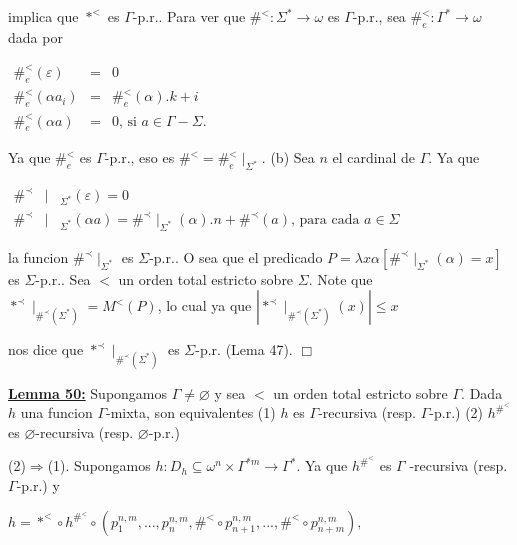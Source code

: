 implica que \(\ast ^{< }\) es \(\Gamma \)-p.r..
Para ver que \(\#^{< }:\Sigma ^{\ast }\rightarrow \omega \) es \(\Gamma \)-p.r., sea \(\#_{e}^{< }:\Gamma ^{\ast }\rightarrow \omega \) dada por

\(\displaystyle \begin{array}{rcl} \#_{e}^{< }(\varepsilon ) & =& 0 \\ \#_{e}^{< }(\alpha a_{i}) & =& \#_{e}^{< }(\alpha ).k+i \\ \#_{e}^{< }(\alpha a) & =& 0\text{, si }a\in \Gamma -\Sigma . \end{array} \)

Ya que \(\#_{e}^{< }\) es \(\Gamma \)-p.r., eso es \(\#^{< }=\#_{e}^{< }\mid _{\Sigma ^{\ast }}\).
(b) Sea \(n\) el cardinal de \(\Gamma .\) Ya que

\(\displaystyle \begin{array}{rcl} \#^{\prec } & \mid & _{\Sigma ^{\ast }}(\varepsilon )=0 \\ \#^{\prec } & \mid & _{\Sigma ^{\ast }}(\alpha a)=\#^{\prec }\mid _{\Sigma ^{\ast }}(\alpha ).n+\#^{\prec }(a)\text{, para cada }a\in \Sigma \end{array} \)

la funcion \(\#^{\prec }\mid _{\Sigma ^{\ast }}\) es \(\Sigma \)-p.r.. O sea que el predicado \(P=\lambda x\alpha \left[ \#^{\prec }\mid _{\Sigma ^{\ast }}(\alpha )=x\right] \) es \(\Sigma \)-p.r.. Sea \(< \) un orden total estricto sobre \(\Sigma \). Note que \(\ast ^{\prec }\mid _{\#^{\prec }(\Sigma ^{\ast })}=M^{< }(P)\), lo cual ya que
\(\displaystyle \left\vert \ast ^{\prec }\mid _{\#^{\prec }(\Sigma ^{\ast })}(x)\right\vert \leq x \)

nos dice que \(\ast ^{\prec }\mid _{\#^{\prec }(\Sigma ^{\ast })}\) es \(\Sigma \)-p.r. (Lema 47). \(\Box\)


\textbf{\underline{Lemma 50:}} Supongamos \(\Gamma \neq \varnothing \) y sea \(< \) un orden total estricto sobre \( \Gamma \). Dada \(h\) una funcion \(\Gamma \)-mixta, son equivalentes
(1) \(h\) es \(\Gamma \)-recursiva (resp. \(\Gamma \)-p.r.)
(2) \(h^{\#^{< }}\) es \(\varnothing \)-recursiva (resp. \(\varnothing \)-p.r.)

\PROOF (2)\(\Rightarrow \)(1). Supongamos \(h:D_{h}\subseteq \omega ^{n}\times \Gamma ^{\ast m}\rightarrow \Gamma ^{\ast }\). Ya que \(h^{\#^{< }}\) es \(\Gamma \) -recursiva (resp. \(\Gamma \)-p.r.) y

\(\displaystyle h=\ast ^{< }\circ h^{\#^{< }}\circ \left( p_{1}^{n,m},...,p_{n}^{n,m},\#^{< }\circ p_{n+1}^{n,m},...,\#^{< }\circ p_{n+m}^{n,m}\right) \text{,} \)

